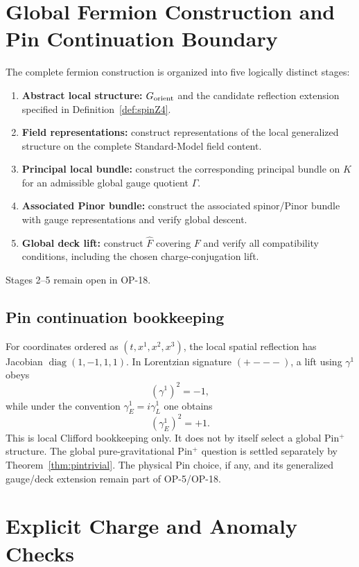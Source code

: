 \documentclass[11pt]{article}
\theoremstyle{canonmath}
\theoremstyle{canonpostulate}
\theoremstyle{canonclaim}
\providecommand{\Klein}{\mathcal{K}}
\def\mathcal#1{#1}%
\begin{document}
\section{Global Fermion Construction and Pin Continuation Boundary}
\label{app:fermion_pin}
The complete fermion construction is organized into five logically distinct stages:
\begin{enumerate}
\item \textbf{Abstract local structure:} $G_{\rm orient}$ and the candidate reflection extension specified in Definition~\ref{def:spinZ4}.
\item \textbf{Field representations:} construct representations of the local generalized structure on the complete Standard-Model field content.
\item \textbf{Principal local bundle:} construct the corresponding principal bundle on $\Klein$ for an admissible global gauge quotient $\Gamma$.
\item \textbf{Associated Pinor bundle:} construct the associated spinor/Pinor bundle with gauge representations and verify global descent.
\item \textbf{Global deck lift:} construct $\widehat F$ covering $F$ and verify all compatibility conditions, including the chosen charge-conjugation lift.
\end{enumerate}
Stages 2--5 remain open in OP-18.

\subsection*{Pin continuation bookkeeping}
For coordinates ordered as $(t,x^1,x^2,x^3)$, the local spatial reflection has Jacobian $\operatorname{diag}(1,-1,1,1)$. In Lorentzian signature $(+---)$, a lift using $\gamma^1$ obeys
\begin{equation}
(\gamma^1)^2=-1,
\end{equation}
while under the convention $\gamma_E^1=i\gamma_L^1$ one obtains
\begin{equation}
(\gamma_E^1)^2=+1.
\end{equation}
This is local Clifford bookkeeping only. It does not by itself select a global Pin$^+$ structure. The global pure-gravitational Pin$^+$ question is settled separately by Theorem~\ref{thm:pintrivial}. The physical Pin choice, if any, and its generalized gauge/deck extension remain part of OP-5/OP-18.

\section{Explicit Charge and Anomaly Checks}
\label{app:anomalies}
\end{document}
